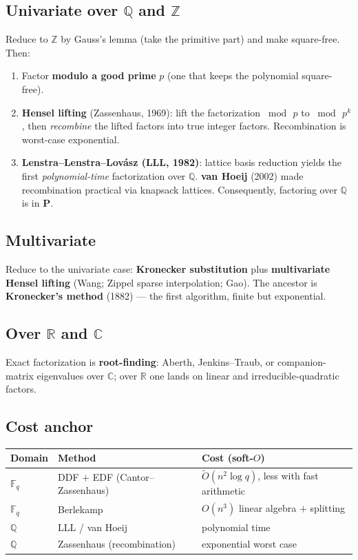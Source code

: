 \documentclass[11pt]{article}
\newcommand{\FF}{\mathbb{F}}
\newcommand{\QQ}{\mathbb{Q}}
\newcommand{\ZZ}{\mathbb{Z}}
\newcommand{\RR}{\mathbb{R}}
\newcommand{\CC}{\mathbb{C}}
\begin{document}
\subsection{Univariate over $\QQ$ and $\ZZ$}

Reduce to $\ZZ$ by Gauss's lemma (take the primitive part) and make square-free.
Then:
\begin{enumerate}[leftmargin=*]
  \item Factor \textbf{modulo a good prime} $p$ (one that keeps the polynomial
        square-free).
  \item \textbf{Hensel lifting} (Zassenhaus, 1969): lift the factorization
        $\bmod\, p$ to $\bmod\, p^{k}$, then \emph{recombine} the lifted factors
        into true integer factors. Recombination is worst-case exponential.
  \item \textbf{Lenstra--Lenstra--Lov\'asz (LLL, 1982)}: lattice basis reduction
        yields the first \emph{polynomial-time} factorization over $\QQ$.
        \textbf{van Hoeij} (2002) made recombination practical via knapsack
        lattices. Consequently, factoring over $\QQ$ is in \textbf{P}.
\end{enumerate}

\subsection{Multivariate}

Reduce to the univariate case: \textbf{Kronecker substitution} plus
\textbf{multivariate Hensel lifting} (Wang; Zippel sparse interpolation; Gao).
The ancestor is \textbf{Kronecker's method} (1882) --- the first algorithm,
finite but exponential.

\subsection{Over $\RR$ and $\CC$}

Exact factorization is \textbf{root-finding}: Aberth, Jenkins--Traub, or
companion-matrix eigenvalues over $\CC$; over $\RR$ one lands on linear and
irreducible-quadratic factors.

\subsection{Cost anchor}

\begin{center}
\begin{tabular}{@{}lll@{}}
\toprule
Domain & Method & Cost (soft-$O$) \\
\midrule
$\FF_q$ & DDF $+$ EDF (Cantor--Zassenhaus) & $\tilde{O}(n^{2}\log q)$, less with fast arithmetic \\
$\FF_q$ & Berlekamp                        & $O(n^{3})$ linear algebra $+$ splitting \\
$\QQ$   & LLL / van Hoeij                  & polynomial time \\
$\QQ$   & Zassenhaus (recombination)       & exponential worst case \\
\bottomrule
\end{tabular}
\end{center}
\end{document}
